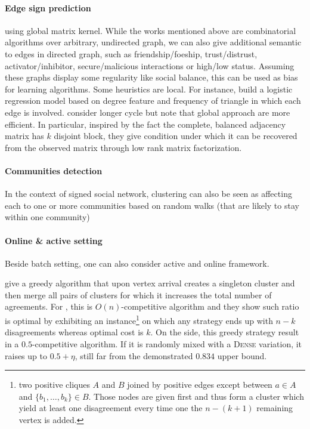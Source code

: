 \paragraph{Edge sign prediction}
\autocite[Section 6]{Kunegis2009} using global matrix kernel.
While the works mentioned above are combinatorial algorithms over arbitrary,
undirected graph, we can also give additional semantic to edges in directed
graph, such as friendship/foeship, trust/distrust, activator/inhibitor,
secure/malicious interactions or high/low status. Assuming these graphs
display some regularity like social balance, this can be used as bias for
learning algorithms. Some heuristics are local. For instance,
\textcite{Leskovec2010} build a logistic regression model based on degree
feature and frequency of triangle in which each edge is involved.
\Textcite{LowRankCompletion14} consider longer cycle but note that global
approach are more efficient. In particular, inspired by the fact the complete,
balanced adjacency matrix has $k$ disjoint block, they give condition under
which it can be recovered from the observed matrix through low rank matrix
factorization.

\paragraph{Communities detection}
In the context of signed social network, clustering can also be seen as
affecting each to one or more communities
\autocite{Yang2007} based on random walks (that are likely to stay within one
community)
\autocites{Yang2007}{Traag2009}{Doreian2009}{Anchuri2012}{Amelio2013}{Li2013}{Chen14}{Jiang2015}


\paragraph{Online \& active setting}
Beside batch setting, one can also consider active
\autocites{Cesa-Bianchi2012b}{Cesa-Bianchi2012a} and online
\autocite{Gentile2013} framework.

\Textcite{mathieu:inria-00455771} give a greedy algorithm that upon vertex
arrival creates a singleton cluster and then merge all pairs of clusters for
which it increases the total number of agreements. For \mind{}, this is
$O(n)$-competitive algorithm and they show such ratio is optimal by exhibiting
an instance\footnote{two positive cliques $A$ and $B$ joined by positive edges
except between $a\in A$ and $\{b_1,\ldots, b_k\}\in B$. Those nodes are given
first and thus form a cluster which yield at least one disagreement every time
one the $n-(k+1)$ remaining vertex is added.} on which any strategy ends up with $n - k$
disagreements whereas optimal cost is $k$. On the \maxa{} side, this greedy
strategy result in a $0.5$-competitive algorithm. If it is randomly mixed with
a \textsc{Dense} variation, it raises up to $0.5+\eta$, still far from the
demonstrated $0.834$ upper bound.

